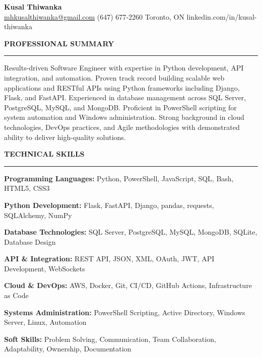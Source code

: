 \documentclass[10pt,letterpaper]{article}
\begin{document}
\begin{center}
{\LARGE\textbf{Kusal Thiwanka}}\\[3pt]
\href{mailto:mhkusalthiwanka@gmail.com}{mhkusalthiwanka@gmail.com}\hspace{2em}%
(647) 677{-}2260\hspace{2em}%
Toronto, ON\hspace{2em}
linkedin.com/in/kusal-thiwanka
\end{center}

\vspace{6pt}

\textbf{PROFESSIONAL SUMMARY}\\[-8pt]
\noindent\rule{\textwidth}{1pt}

\vspace{-2pt}

Results-driven Software Engineer with expertise in Python development, API integration, and automation. Proven track record building scalable web applications and RESTful APIs using Python frameworks including Django, Flask, and FastAPI. Experienced in database management across SQL Server, PostgreSQL, MySQL, and MongoDB. Proficient in PowerShell scripting for system automation and Windows administration. Strong background in cloud technologies, DevOps practices, and Agile methodologies with demonstrated ability to deliver high-quality solutions.

\vspace{8pt}

\textbf{TECHNICAL SKILLS}\\[-8pt]
\noindent\rule{\textwidth}{1pt}

\vspace{-2pt}

\textbf{Programming Languages:} Python, PowerShell, JavaScript, SQL, Bash, HTML5, CSS3

\textbf{Python Development:} Flask, FastAPI, Django, pandas, requests, SQLAlchemy, NumPy

\textbf{Database Technologies:} SQL Server, PostgreSQL, MySQL, MongoDB, SQLite, Database Design

\textbf{API \& Integration:} REST API, JSON, XML, OAuth, JWT, API Development, WebSockets

\textbf{Cloud \& DevOps:} AWS, Docker, Git, CI/CD, GitHub Actions, Infrastructure as Code

\textbf{Systems Administration:} PowerShell Scripting, Active Directory, Windows Server, Linux, Automation

\textbf{Soft Skills:} Problem Solving, Communication, Team Collaboration, Adaptability, Ownership, Documentation
\end{document}
